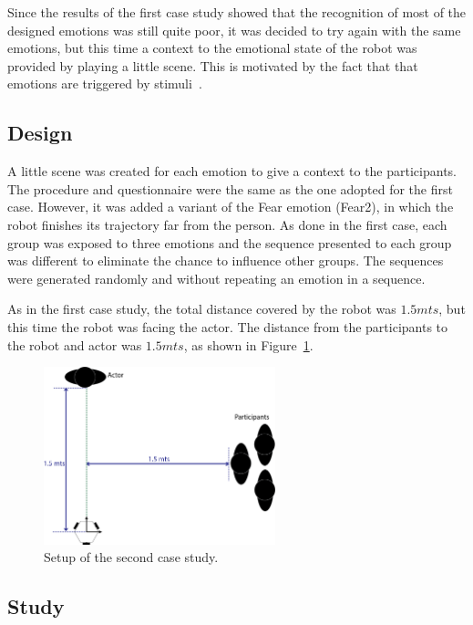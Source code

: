 Since the results of the first case study showed that the recognition of most of the designed emotions was still quite poor, it was decided to try again with the same emotions, but this time a context to the emotional state of the robot was provided by playing a little scene. This is motivated by the fact that that emotions are triggered by stimuli~\cite{Plutchik2001,cacioppo2000handbook}.

\subsection{Design}

A little scene was created for each emotion to give a context to the participants. The procedure and questionnaire were the same as the one adopted for the first case. However, it was added a variant of the Fear emotion (Fear2), in which the robot finishes its trajectory far from the person. As done in the first case, each group was exposed to three emotions and the sequence presented to each group was different to eliminate the chance to influence other groups. The sequences were generated randomly and without repeating an emotion in a sequence.

As in the first case study, the total distance covered by the robot was $1.5 mts$, but this time the robot was facing the actor. The distance from the participants to the robot and actor was $1.5 mts$, as shown in Figure~\ref{fig:setup2}. 

\begin{figure}[h]
	\centering
	\includegraphics[width=0.6\textwidth]{./Images/SecondCase.png} 
	\caption{Setup of the second case study.}
	\label{fig:setup2}
\end{figure}
\subsection{Study}

